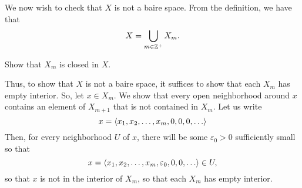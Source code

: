 \begin{exm}
\begin{savenotes}
We now wish to check that $X$ is not a baire space.  From the definition, we have that
\begin{equation}
X=\bigcup _{m\in \mathbb{Z} ^+}X_m.
\end{equation}
\begin{exr}
Show that $X_m$ is closed in $X$.
\end{exr}
Thus, to show that $X$ is not a baire space, it suffices to show that each $X_m$ has empty interior.  So, let $x\in X_m$.  We show that every open neighborhood around $x$ contains an element of $X_{m+1}$ that is not contained in $X_m$.  Let us write
\begin{equation}
x=\langle x_1,x_2,\ldots ,x_m,0,0,0,\ldots\rangle
\end{equation}
Then, for every neighborhood $U$ of $x$, there will be some $\varepsilon _0>0$ sufficiently small so that
\begin{equation}
x=\langle x_1,x_2,\ldots ,x_m,\varepsilon _0,0,0,\ldots\rangle\in U,
\end{equation}
so that $x$ is not in the interior of $X_m$, so that each $X_m$ has empty interior.
\end{savenotes}
\end{exm}

